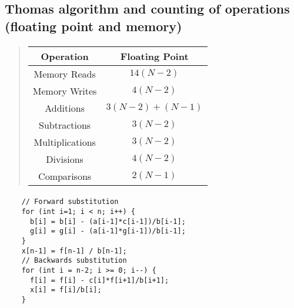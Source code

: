 \documentclass[%
oneside,                 %
final,                   %
10pt]{article}
\begin{document}
\subsection*{Thomas algorithm and counting of operations (floating point and memory)}

\paragraph{}



\begin{quote}
\begin{tabular}{cc}
\hline
\multicolumn{1}{c}{ Operation } & \multicolumn{1}{c}{ Floating Point } \\
\hline
Memory Reads    & $14(N-2)$        \\
Memory Writes   & $4(N-2)$         \\
Additions       & $3(N-2) + (N-1)$ \\
Subtractions    & $3(N-2)$         \\
Multiplications & $3(N-2)$         \\
Divisions       & $4(N-2)$         \\
Comparisons     & $2(N-1)$         \\
\hline
\end{tabular}
\end{quote}

\noindent




\paragraph{}
\begin{verbatim}
    // Forward substitution                                                                       
    for (int i=1; i < n; i++) {
      b[i] = b[i] - (a[i-1]*c[i-1])/b[i-1];
      g[i] = g[i] - (a[i-1]*g[i-1])/b[i-1];
    }
    x[n-1] = f[n-1] / b[n-1];
    // Backwards substitution                                                           
    for (int i = n-2; i >= 0; i--) {
      f[i] = f[i] - c[i]*f[i+1]/b[i+1];
      x[i] = f[i]/b[i];
    }
\end{verbatim}
\end{document}
